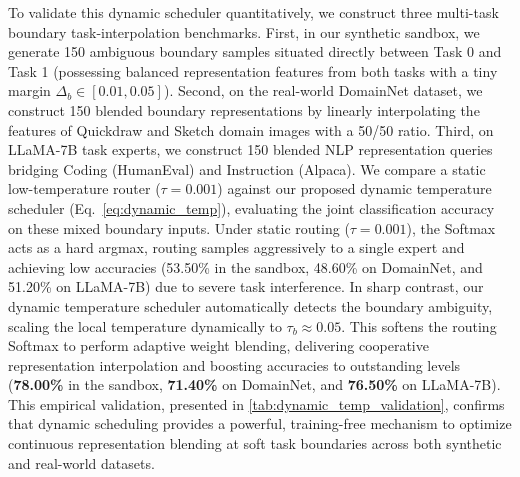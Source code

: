 \begin{itemize}
    To validate this dynamic scheduler quantitatively, we construct three multi-task boundary task-interpolation benchmarks. First, in our synthetic sandbox, we generate 150 ambiguous boundary samples situated directly between Task 0 and Task 1 (possessing balanced representation features from both tasks with a tiny margin $\Delta_b \in [0.01, 0.05]$). Second, on the real-world DomainNet dataset, we construct 150 blended boundary representations by linearly interpolating the features of Quickdraw and Sketch domain images with a 50/50 ratio. Third, on LLaMA-7B task experts, we construct 150 blended NLP representation queries bridging Coding (HumanEval) and Instruction (Alpaca). We compare a static low-temperature router ($\tau=0.001$) against our proposed dynamic temperature scheduler (Eq.~\ref{eq:dynamic_temp}), evaluating the joint classification accuracy on these mixed boundary inputs. Under static routing ($\tau=0.001$), the Softmax acts as a hard argmax, routing samples aggressively to a single expert and achieving low accuracies (53.50\% in the sandbox, 48.60\% on DomainNet, and 51.20\% on LLaMA-7B) due to severe task interference. In sharp contrast, our dynamic temperature scheduler automatically detects the boundary ambiguity, scaling the local temperature dynamically to $\tau_b \approx 0.05$. This softens the routing Softmax to perform adaptive weight blending, delivering cooperative representation interpolation and boosting accuracies to outstanding levels (\textbf{78.00\%} in the sandbox, \textbf{71.40\%} on DomainNet, and \textbf{76.50\%} on LLaMA-7B). This empirical validation, presented in \cref{tab:dynamic_temp_validation}, confirms that dynamic scheduling provides a powerful, training-free mechanism to optimize continuous representation blending at soft task boundaries across both synthetic and real-world datasets.


\end{itemize}
